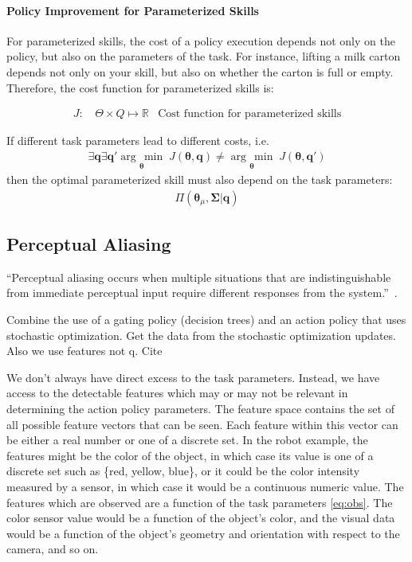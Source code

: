 \documentclass[12pt]{article}
\newcommand{\mymath}[1]{\ensuremath{#1}\xspace}
\newcommand{\app}    {\mymath{\bm{\theta}}}
\newcommand{\appsp}  {\mymath{\Theta}}
\newcommand{\polg}   {\mymath{\Pi}}
\newcommand{\taskp}  {\mymath{\mathbf{q}}}
\newcommand{\taskpsp}{\mymath{Q}}
\newcommand{\costf}  {\mymath{J}}
\newcommand{\covar}  {\mymath{\bm{\Sigma}}}
\newcommand{\argmin}[1]{\underset{#1}{\operatorname{arg}\,\operatorname{min}}\;}
\begin{document}
\paragraph{Policy Improvement for Parameterized Skills} For parameterized skills, the cost of a policy execution depends not only on the policy, but also on the parameters of the task. For instance, lifting a milk carton depends not only on your skill, but also on whether the carton is full or empty. Therefore, the cost function for parameterized skills is:

\begin{align}
\costf\mbox{: } &\label{eq:cost_task} \appsp \times \taskpsp \mapsto \mathbb{R}&\mbox{Cost function for parameterized skills}
\end{align}

If different task parameters lead to different costs, i.e.
%
\begin{align}
\label{eq:relq1} \exists \taskp \exists \taskp' \argmin{\app}\costf(\app,\taskp) \neq \argmin{\app}\costf(\app,\taskp')
\end{align}
%
then the optimal parameterized skill must also depend on the task parameters:
%
\begin{align}
\label{eq:pol_par_fun_par}\polg(\app_\mu,\covar|\taskp)
\end{align}

\subsection{Perceptual Aliasing}

``Perceptual aliasing occurs when multiple situations that are indistinguishable from immediate perceptual input require different responses from the system.''~\cite{chrisman92reinforcement}.

\color{red}Combine the use of a gating policy (decision trees) and an action policy that uses stochastic optimization. Get the data from the stochastic optimization updates. Also we use features not q. Cite \citet{piater11learning}\color{black}

We don't always have direct excess to the task parameters. Instead, we have access to the detectable features which may or may not be relevant in determining the action policy parameters.  The feature space contains the set of all possible feature vectors that can be seen. Each feature within this vector can be either a real number or one of a discrete set. In the robot example, the features might be the color of the object, in which case its value is one of a discrete set such as \{red, yellow, blue\}, or it could be the color intensity measured by a sensor, in which case it would be a continuous numeric value. The features which are observed are a function of the task parameters \eqref{eq:obs}. The color sensor value would be a function of the object's color, and the visual data would be a function of the object's geometry and orientation with respect to the camera, and so on.
\end{document}
